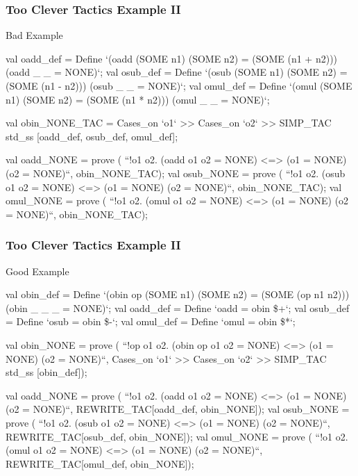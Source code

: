 \begin{frame}[fragile]
\frametitle{Too Clever Tactics Example II}

\begin{alertblock}{Bad Example}
\begin{semiverbatim}\scriptsize
val oadd_def = Define `(oadd (SOME n1) (SOME n2) = (SOME (n1 + n2))) \holAnd{} 
                       (oadd _         _         = NONE)`;
val osub_def = Define `(osub (SOME n1) (SOME n2) = (SOME (n1 - n2))) \holAnd{} 
                       (osub _         _         = NONE)`;
val omul_def = Define `(omul (SOME n1) (SOME n2) = (SOME (n1 * n2))) \holAnd{} 
                       (omul _         _         = NONE)`;

val obin_NONE_TAC = 
  Cases_on `o1` >> Cases_on `o2` >> 
  SIMP_TAC std_ss [oadd_def, osub_def, omul_def];

val oadd_NONE = prove (
  ``!o1 o2. (oadd o1 o2 = NONE) <=> (o1 = NONE) \holOr{} (o2 = NONE)``, 
  obin_NONE_TAC);
val osub_NONE = prove (
  ``!o1 o2. (osub o1 o2 = NONE) <=> (o1 = NONE) \holOr{} (o2 = NONE)``, 
  obin_NONE_TAC);
val omul_NONE = prove (
  ``!o1 o2. (omul o1 o2 = NONE) <=> (o1 = NONE) \holOr{} (o2 = NONE)``, 
  obin_NONE_TAC);
\end{semiverbatim}
\end{alertblock}
\end{frame}

\begin{frame}[fragile]
\frametitle{Too Clever Tactics Example II}

\begin{exampleblock}{Good Example}
\begin{semiverbatim}\scriptsize
val obin_def = Define `(obin op (SOME n1) (SOME n2) = (SOME (op n1 n2))) \holAnd{} 
                       (obin _  _         _         = NONE)`;
val oadd_def = Define `oadd = obin \$+`;
val osub_def = Define `osub = obin \$-`;
val omul_def = Define `omul = obin \$*`;

val obin_NONE = prove (
  ``!op o1 o2. (obin op o1 o2 = NONE) <=> (o1 = NONE) \holOr{} (o2 = NONE)``,  
  Cases_on `o1` >> Cases_on `o2` >> SIMP_TAC std_ss [obin_def]);

val oadd_NONE = prove (
  ``!o1 o2. (oadd o1 o2 = NONE) <=> (o1 = NONE) \holOr{} (o2 = NONE)``, 
  REWRITE_TAC[oadd_def, obin_NONE]);
val osub_NONE = prove (
  ``!o1 o2. (osub o1 o2 = NONE) <=> (o1 = NONE) \holOr{} (o2 = NONE)``, 
  REWRITE_TAC[osub_def, obin_NONE]);
val omul_NONE = prove (
  ``!o1 o2. (omul o1 o2 = NONE) <=> (o1 = NONE) \holOr{} (o2 = NONE)``, 
  REWRITE_TAC[omul_def, obin_NONE]);
\end{semiverbatim}
\end{exampleblock}
\end{frame}


